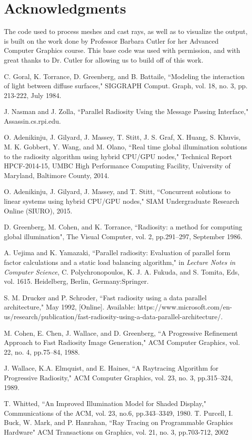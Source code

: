 \documentclass[conference]{IEEEtran}
\begin{document}
\section{Acknowledgments}
The code used to process meshes and cast rays, as well as to visualize the output, is built on the work done by Professor Barbara Cutler for her Advanced Computer Graphics course. This base code was used with permission, and with great thanks to Dr. Cutler for allowing us to build off of this work.
\begin{thebibliography}{00}
 C. Goral, K. Torrance, D. Greenberg, and B. Battaile, ``Modeling the interaction of light between diffuse surfaces," SIGGRAPH Comput. Graph, vol. 18, no. 3, pp. 213-222, July 1984.

 J. Nasman and J. Zolla, ``Parallel Radiosity Using the Message Passing Interface," Assassin.cs.rpi.edu.

 O. Adenikinju, J. Gilyard, J. Massey, T. Stitt, J. S. Graf, X. Huang, S. Khuvis, M. K. Gobbert, Y. Wang, and M. Olano, ``Real time global illumination solutions to the radiosity algorithm using hybrid CPU/GPU nodes," Technical Report HPCF-2014-15, UMBC High Performance Computing Facility, University of Maryland, Baltimore County, 2014.

 O. Adenikinju, J. Gilyard, J. Massey, and T. Stitt, ``Concurrent solutions to linear systems using hybrid CPU/GPU nodes," SIAM Undergraduate Research Online (SIURO), 2015.

 D. Greenberg, M. Cohen, and K. Torrance, ``Radiosity: a method
for computing global illumination", The Visual Computer, vol. 2, pp.291–297, September 1986.

 A. Uejima and K. Yamazaki, ``Parallel radiosity: Evaluation of parallel form factor calculations and a static load balancing algorithm," in \emph{Lecture Notes in Computer Science}, C. Polychronopoulos, K. J. A. Fukuda, and S. Tomita, Eds, vol. 1615. Heidelberg, Berlin, Germany:Springer.

 S. M. Drucker and P. Schroder, ``Fast radiosity using a data parallel architecture," May 1992, [Online]. Available: https://www.microsoft.com/en-us/research/publication/fast-radiosity-using-a-data-parallel-architecture/.

 M. Cohen, E. Chen, J. Wallace, and D. Greenberg, ``A Progressive Refinement Approach to Fast Radiosity Image Generation," ACM Computer Graphics, vol. 22, no. 4, pp.75–84, 1988.

 J. Wallace, K.A. Elmquist, and E. Haines, ``A Raytracing Algorithm for Progressive Radiosity," ACM Computer Graphics, vol. 23, no. 3, pp.315–324, 1989.

 T. Whitted, ``An Improved Illumination Model for Shaded Display," Communications of the ACM, vol. 23, no.6, pp.343–3349, 1980.
 T. Purcell, I. Buck, W. Mark, and P. Hanrahan, ``Ray Tracing on Programmable Graphics Hardware" ACM Transactions on Graphics, vol. 21, no. 3, pp.703-712, 2002

\end{thebibliography}
\end{document}
